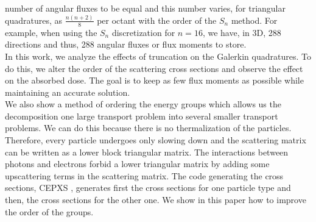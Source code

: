 number of angular fluxes to be equal and this number varies, for triangular 
quadratures, as $\frac{n(n+2)}{8}$ per octant with the order of the $S_n$ method.  
For example, when using the $S_n$ discretization for $n=16$, we have, in 3D, 
288 directions and thus, 288 angular fluxes or flux moments to store.\\
In this work, we analyze the effects of truncation on the Galerkin quadratures.
To do this, we
alter the order of the scattering cross sections and observe the effect on the 
absorbed dose. The goal is to keep as few flux moments as possible while 
maintaining an accurate solution.\\
We also show a method of ordering
the energy groups which allows us the decomposition one large transport
problem into several smaller transport problems. We can do this because there 
is no thermalization of the particles. Therefore, every
particle undergoes only slowing down and the scattering matrix can be written
as a lower block triangular matrix. The interactions between photons and
electrons forbid a lower triangular matrix by adding some
upscattering terms in the scattering matrix. The code generating the cross
sections, CEPXS \cite{cepxs}, generates first the cross sections for one
particle type and then, the cross sections for the other one. We show in this
paper how to improve the order of the groups.
